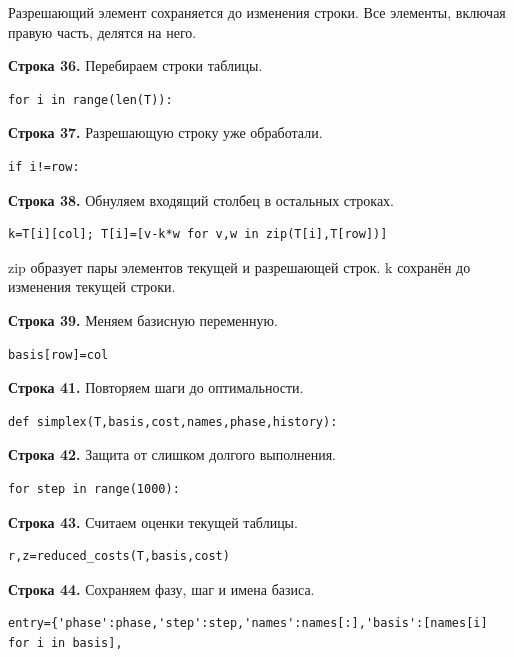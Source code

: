 \documentclass[12pt,a4paper]{article}
\begin{document}
Разрешающий элемент сохраняется до изменения строки. Все элементы, включая правую часть, делятся на него.
\par\textbf{Строка 36.} Перебираем строки таблицы.
\begin{Verbatim}[fontsize=\small,breaklines=true,breakanywhere=true]
    for i in range(len(T)):
\end{Verbatim}
\par\textbf{Строка 37.} Разрешающую строку уже обработали.
\begin{Verbatim}[fontsize=\small,breaklines=true,breakanywhere=true]
        if i!=row:
\end{Verbatim}
\par\textbf{Строка 38.} Обнуляем входящий столбец в остальных строках.
\begin{Verbatim}[fontsize=\small,breaklines=true,breakanywhere=true]
            k=T[i][col]; T[i]=[v-k*w for v,w in zip(T[i],T[row])]
\end{Verbatim}
zip образует пары элементов текущей и разрешающей строк. k сохранён до изменения текущей строки.
\par\textbf{Строка 39.} Меняем базисную переменную.
\begin{Verbatim}[fontsize=\small,breaklines=true,breakanywhere=true]
    basis[row]=col
\end{Verbatim}
\par\textbf{Строка 41.} Повторяем шаги до оптимальности.
\begin{Verbatim}[fontsize=\small,breaklines=true,breakanywhere=true]
def simplex(T,basis,cost,names,phase,history):
\end{Verbatim}
\par\textbf{Строка 42.} Защита от слишком долгого выполнения.
\begin{Verbatim}[fontsize=\small,breaklines=true,breakanywhere=true]
    for step in range(1000):
\end{Verbatim}
\par\textbf{Строка 43.} Считаем оценки текущей таблицы.
\begin{Verbatim}[fontsize=\small,breaklines=true,breakanywhere=true]
        r,z=reduced_costs(T,basis,cost)
\end{Verbatim}
\par\textbf{Строка 44.} Сохраняем фазу, шаг и имена базиса.
\begin{Verbatim}[fontsize=\small,breaklines=true,breakanywhere=true]
        entry={'phase':phase,'step':step,'names':names[:],'basis':[names[i] for i in basis],
\end{Verbatim}
\end{document}

